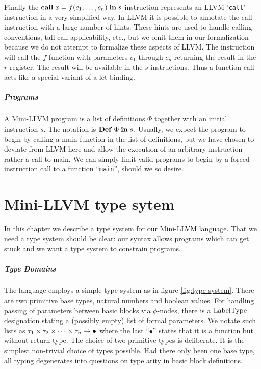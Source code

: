 \documentclass[a4paper, oneside, 10pt, draft]{memoir}
\begin{document}
Finally the $\mathbf{call} \; x = f (c_1, \dotsc, c_n)\; \mathbf{in} \; s$ instruction
represents an LLVM '\texttt{call}' instruction in a very simplified
way. In LLVM it is possible to annotate the call-instruction with a
large number of hints. These hints are used to handle calling
conventions, tall-call applicability, etc., but we omit them in our
formalization because we do not attempt to formalize these aspects of
LLVM. The instruction will call the $f$ function with parameters $c_1$
through $c_n$ returning the result in the $r$ register. The result
will be available in the $s$ instructions. Thus a function call acts
like a special variant of a let-binding.

\paragraph{Programs}

A Mini-LLVM program is a list of definitions $\Phi$ together with an
initial instruction $s$. The notation is $\mathbf{Def} \; \Phi \; \mathbf{in} \; s$. Usually, we
expect the program to begin by calling a main-function in the list of
definitions, but we have chosen to deviate from LLVM here and allow
the execution of an arbitrary instruction rather a call to main. We
can simply limit valid programs to begin by a forced instruction
call to a function ``\texttt{main}'', should we so desire.

\chapter{Mini-LLVM type sytem}
\label{chap:type-system}

In this chapter we describe a type system for our Mini-LLVM
language. That we need a type system should be clear: our syntax
allows programs which can get stuck and we want a type system to
constrain programs.

\paragraph{Type Domains} The language employs a simple type system as in
figure \ref{fig:type-system}. There are two primitive base types,
natural numbers and boolean values. For handling passing of parameters
between basic blocks via $\phi$-nodes, there is a $\mathrm{Label Type}$
designation stating a (possibly empty) list of formal parameters. We
notate such lists as $\tau_1 \times \tau_2 \times \dotsb \times \tau_n -> \bullet$ where the last
``$\bullet$'' states that it is a function but without return type.
The choice of two primitive types is deliberate. It is the simplest
non-trivial choice of types possible. Had there only been one base
type, all typing degenerates into questions on type arity in basic
block definitions.
\end{document}
